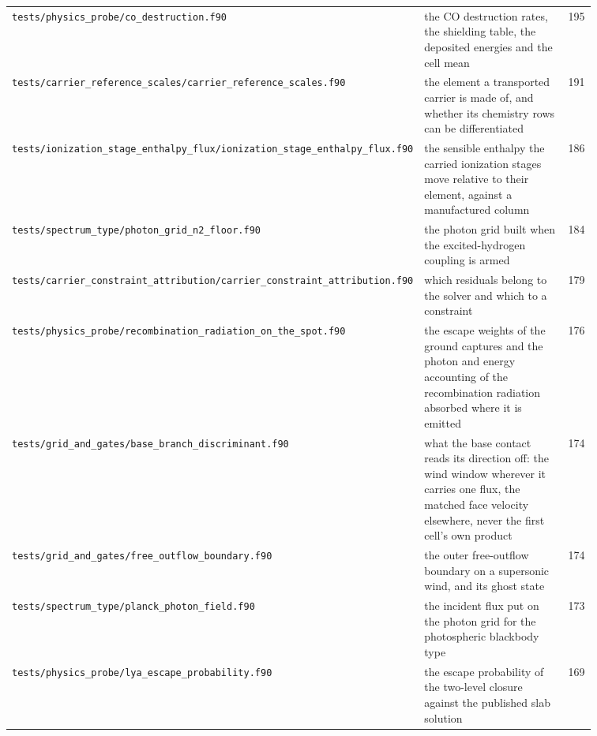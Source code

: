 {\begin{longtable}{@{}>{\raggedright\arraybackslash}p{0.36\linewidth} >{\raggedright\arraybackslash}p{0.50\linewidth} r@{}}
\texttt{tests/\allowbreak physics\_\allowbreak probe/\allowbreak co\_\allowbreak destruction.f90} & the CO destruction rates, the shielding table, the deposited energies and the cell mean & 195 \\
\texttt{tests/\allowbreak carrier\_\allowbreak reference\_\allowbreak scales/\allowbreak carrier\_\allowbreak reference\_\allowbreak scales.f90} & the element a transported carrier is made of, and whether its chemistry rows can be differentiated & 191 \\
\texttt{tests/\allowbreak ionization\_\allowbreak stage\_\allowbreak enthalpy\_\allowbreak flux/\allowbreak ionization\_\allowbreak stage\_\allowbreak enthalpy\_\allowbreak flux.f90} & the sensible enthalpy the carried ionization stages move relative to their element, against a manufactured column & 186 \\
\texttt{tests/\allowbreak spectrum\_\allowbreak type/\allowbreak photon\_\allowbreak grid\_\allowbreak n2\_\allowbreak floor.f90} & the photon grid built when the excited-hydrogen coupling is armed & 184 \\
\texttt{tests/\allowbreak carrier\_\allowbreak constraint\_\allowbreak attribution/\allowbreak carrier\_\allowbreak constraint\_\allowbreak attribution.f90} & which residuals belong to the solver and which to a constraint & 179 \\
\texttt{tests/\allowbreak physics\_\allowbreak probe/\allowbreak recombination\_\allowbreak radiation\_\allowbreak on\_\allowbreak the\_\allowbreak spot.f90} & the escape weights of the ground captures and the photon and energy accounting of the recombination radiation absorbed where it is emitted & 176 \\
\texttt{tests/\allowbreak grid\_\allowbreak and\_\allowbreak gates/\allowbreak base\_\allowbreak branch\_\allowbreak discriminant.f90} & what the base contact reads its direction off: the wind window wherever it carries one flux, the matched face velocity elsewhere, never the first cell's own product & 174 \\
\texttt{tests/\allowbreak grid\_\allowbreak and\_\allowbreak gates/\allowbreak free\_\allowbreak outflow\_\allowbreak boundary.f90} & the outer free-outflow boundary on a supersonic wind, and its ghost state & 174 \\
\texttt{tests/\allowbreak spectrum\_\allowbreak type/\allowbreak planck\_\allowbreak photon\_\allowbreak field.f90} & the incident flux put on the photon grid for the photospheric blackbody type & 173 \\
\texttt{tests/\allowbreak physics\_\allowbreak probe/\allowbreak lya\_\allowbreak escape\_\allowbreak probability.f90} & the escape probability of the two-level closure against the published slab solution & 169 \\

\end{longtable}}
